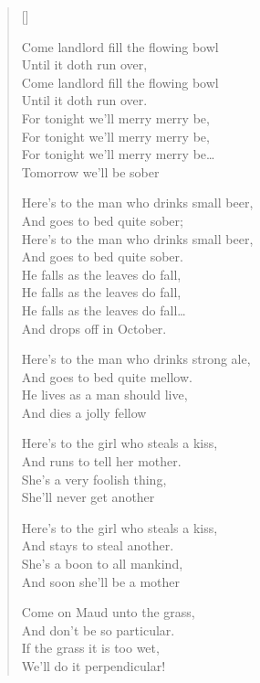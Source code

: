 \pagebreak
\settowidth{\versewidth}{For tonight we'll merry merry be}
\begin{verse}[\versewidth]\\

\begin{chorus}
Come landlord fill the flowing bowl \\
Until it doth run over,\\
Come landlord fill the flowing bowl\\
Until it doth run over.\\
For tonight we'll merry merry be,\\
For tonight we'll merry merry be,\\
For tonight we'll merry merry be\dots{}\\
Tomorrow we'll be sober
\end{chorus}


Here's to the man who drinks small beer,\\
And goes to bed quite sober;\\
Here's to the man who drinks small beer, \\
And goes to bed quite sober.\\
He falls as the leaves do fall,\\
He falls as the leaves do fall,\\
He falls as the leaves do fall\dots{}\\
And drops off in October.

Here's to the man who drinks strong ale,\\
And goes to bed quite mellow.\\
He lives as a man should live,\\
And dies a jolly fellow

Here's to the girl who steals a kiss,\\
And runs to tell her mother.\\
She's a very foolish thing,\\
She'll never get another

Here's to the girl who steals a kiss,\\
And stays to steal another.\\
She's a boon to all mankind,\\
And soon she'll be a mother

Come on Maud unto the grass,\\
And don't be so particular.\\
If the grass it is too wet,\\
We'll do it perpendicular!
\end{verse}
